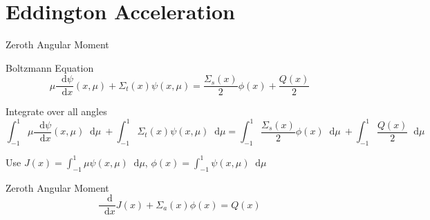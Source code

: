 \documentclass[10pt]{beamer}
\newcommand{\ud}{\mathop{}\!\mathrm{d}} %
\newcommand{\dderiv}[2]{\frac{\ud #1}{\ud #2}}
\begin{document}









\section{Eddington Acceleration}

\begin{frame}{Zeroth Angular Moment}

    \onslide<+->
	Boltzmann Equation
	\begin{equation*}
	        \mu \dderiv{\psi}{x}(x, \mu) + 
	        \Sigma_t(x) \psi(x,\mu) = 
	        \frac{\Sigma_s(x)}{2} \phi(x) + 
	        \frac{Q(x)}{2} 
	\end{equation*}

    \onslide<+->
	Integrate over all angles \footnotesize
	\begin{equation*}
	    \int_{-1}^{1} \mu \dderiv{\psi}{x}(x, \mu) \ud \mu \ + 
	    \int_{-1}^{1} \Sigma_t(x) \psi(x,\mu) \ud \mu = 
	    \int_{-1}^{1} \frac{\Sigma_s(x)}{2} \phi(x) \ud \mu \ + 
	    \int_{-1}^{1} \frac{Q(x)}{2} \ud \mu 
	\end{equation*}
    \normalsize

    \onslide<+->
	Use $J(x) = \int_{-1}^{1} \mu \psi(x,\mu) \ud \mu$, 
		$\phi(x) = \int_{-1}^{1} \psi(x,\mu) \ud \mu$ 
	\begin{block}{Zeroth Angular Moment}
	\begin{equation*}
		\dderiv{}{x} J(x) + \Sigma_a(x) \phi(x) = Q(x)
	\end{equation*}
	\end{block}

\end{frame}
\end{document}
